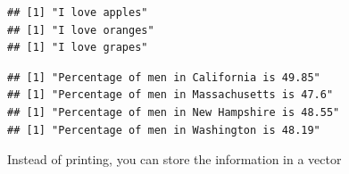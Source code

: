 \documentclass[
]{book}
\newenvironment{Shaded}{\begin{snugshade}}{\end{snugshade}}
\newcommand{\ControlFlowTok}[1]{\textcolor[rgb]{0.13,0.29,0.53}{\textbf{#1}}}
\newcommand{\DataTypeTok}[1]{\textcolor[rgb]{0.13,0.29,0.53}{#1}}
\newcommand{\DecValTok}[1]{\textcolor[rgb]{0.00,0.00,0.81}{#1}}
\newcommand{\KeywordTok}[1]{\textcolor[rgb]{0.13,0.29,0.53}{\textbf{#1}}}
\newcommand{\NormalTok}[1]{#1}
\newcommand{\OperatorTok}[1]{\textcolor[rgb]{0.81,0.36,0.00}{\textbf{#1}}}
\newcommand{\StringTok}[1]{\textcolor[rgb]{0.31,0.60,0.02}{#1}}
\theoremstyle{definition}
\theoremstyle{definition}
\theoremstyle{definition}
\theoremstyle{remark}
\begin{document}
\begin{verbatim}
## [1] "I love apples"
## [1] "I love oranges"
## [1] "I love grapes"
\end{verbatim}

\begin{Shaded}
\end{Shaded}

\begin{verbatim}
## [1] "Percentage of men in California is 49.85"
## [1] "Percentage of men in Massachusetts is 47.6"
## [1] "Percentage of men in New Hampshire is 48.55"
## [1] "Percentage of men in Washington is 48.19"
\end{verbatim}

Instead of printing, you can store the information in a vector
\end{document}
